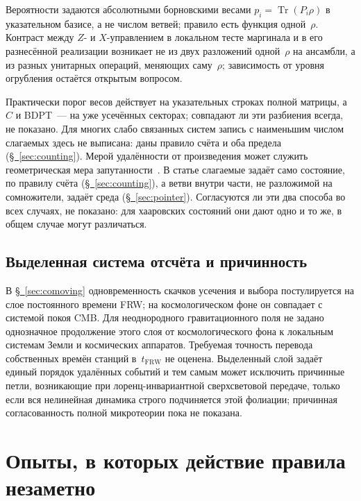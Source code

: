 \documentclass[11pt,a4paper]{article}
\DeclareMathOperator{\Tr}{Tr}
\begin{document}
Вероятности задаются абсолютными борновскими весами $p_i=\Tr(P_i\rho)$ в указательном базисе, а не числом ветвей; правило есть функция одной~$\rho$. Контраст между $Z$- и $X$-управлением в локальном тесте маргинала и в его разнесённой реализации возникает не из двух разложений одной~$\rho$ на ансамбли, а из разных унитарных операций, меняющих саму~$\rho$; зависимость от уровня огрубления остаётся открытым вопросом.

Практически порог весов действует на указательных строках полной матрицы, а $C$ и BDPT~--- на уже усечённых секторах; совпадают ли эти разбиения всегда, не показано. Для многих слабо связанных систем запись с наименьшим числом слагаемых здесь не выписана: даны правило счёта и оба предела (\hyperref[sec:counting]{\S~\ref*{sec:counting}}). Мерой удалённости от произведения может служить геометрическая мера запутанности~\cite{wei2003}. В статье слагаемые задаёт само состояние, по правилу счёта (\hyperref[sec:counting]{\S~\ref*{sec:counting}}), а ветви внутри части, не разложимой на сомножители, задаёт среда (\hyperref[sec:pointer]{\S~\ref*{sec:pointer}}). Согласуются ли эти два способа во всех случаях, не показано: для хааровских состояний они дают одно и то же, в общем случае могут различаться.

\subsection{Выделенная система отсчёта и причинность}
\label{sec:discussion-comoving}

В \hyperref[sec:comoving]{\S~\ref*{sec:comoving}} одновременность скачков усечения и выбора постулируется на слое постоянного времени FRW; на космологическом фоне он совпадает с системой покоя CMB. Для неоднородного гравитационного поля не задано однозначное продолжение этого слоя от космологического фона к локальным системам Земли и космических аппаратов. Требуемая точность перевода собственных времён станций в~$t_{\mathrm{FRW}}$ не оценена. Выделенный слой задаёт единый порядок удалённых событий и тем самым может исключить причинные петли, возникающие при лоренц-инвариантной сверхсветовой передаче, только если вся нелинейная динамика строго подчиняется этой фолиации; причинная согласованность полной микротеории пока не показана.

\appendix
\section{Опыты, в которых действие правила незаметно}
\label{sec:scales}
\end{document}
